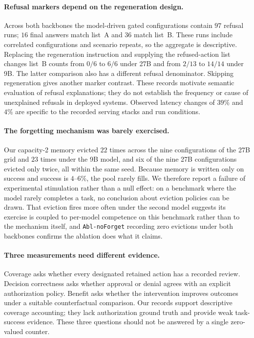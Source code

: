 \documentclass[11pt]{article}
\begin{document}
\paragraph{Refusal markers depend on the regeneration design.}
Across both backbones the model-driven gated configurations contain $97$ refusal runs;
$16$ final answers match list~A and $36$ match list~B. These runs include correlated
configurations and scenario repeats, so the aggregate is descriptive. Replacing the
regeneration instruction and supplying the refused-action list changes list~B counts
from $0/6$ to $6/6$ under 27B and from $2/13$ to $14/14$ under 9B. The latter
comparison also has a different refusal denominator. Skipping regeneration gives
another marker contrast. These records motivate semantic evaluation of refusal
explanations; they do not establish the frequency or cause of unexplained refusals in
deployed systems. Observed latency changes of $39\%$ and $4\%$ are specific to the
recorded serving stacks and run conditions.

\paragraph{The forgetting mechanism was barely exercised.}
Our capacity-2 memory evicted $22$ times across the nine configurations of the 27B grid
and $23$ times under the 9B model, and six of the nine 27B configurations evicted only
twice, all within the same seed. Because memory is written only on success and success is
$4$--$6\%$, the pool rarely fills. We therefore report a failure of experimental
stimulation rather than a null effect: on a benchmark where the model rarely completes a
task, no conclusion about eviction policies can be drawn. That eviction fires more often
under the second model suggests its exercise is coupled to per-model competence on this
benchmark rather than to the mechanism itself, and \texttt{Abl-noForget} recording zero
evictions under both backbones confirms the ablation does what it claims.

\paragraph{Three measurements need different evidence.}
Coverage asks whether every designated retained action has a recorded review. Decision correctness asks whether approval or denial agrees with an explicit authorization policy. Benefit asks whether the intervention improves outcomes under a suitable counterfactual comparison. Our records support descriptive coverage accounting; they lack authorization ground truth and provide weak task-success evidence. These three questions should not be answered by a single zero-valued counter.
\end{document}
